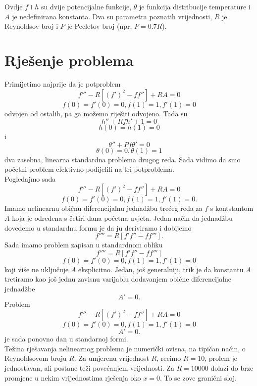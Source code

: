 \documentclass[a4paper,12pt]{article}
\newtheorem{rem}[thm]{Napomena}
\newtheorem{exa}[thm]{Primjer}
\begin{document}
Ovdje $f$ i $h$ su dvije potencijalne funkcije, $\theta$ je funkcija distribucije temperature i $A$ je nedefinirana konstanta. Dva su parametra poznatih vrijednosti, $R$ je Reynoldsov broj i $P$ je Pecletov broj (npr. $P=0.7R$).\\
  




\section{Rješenje problema}


Primijetimo najprije da je potproblem
\[ f''' - R [(f')^2 - ff''] + RA = 0 \]
\[ f(0)=f'(0)=0, f(1)=1, f'(1)=0 \]
odvojen od ostalih, pa ga možemo riješiti odvojeno. Tada su 
\[ h'' + Rfh' + 1 = 0 \]
\[ h(0)=h(1)=0 \]
i
\[ \theta'' + Pf\theta' = 0 \]
\[ \theta(0)=0, \theta(1)=1 \]
dva zasebna, linearna standardna problema drugog reda. Sada vidimo da smo početni problem efektivno podijelili na tri potproblema. \\

Pogledajmo sada  
\[ f''' - R [(f')^2 - ff''] + RA = 0 \]
\[ f(0)=f'(0)=0, f(1)=1, f'(1)=0  .\]
Imamo nelinearnu običnu diferencijalnu jednadžbu trećeg reda za $f$ s kontstantom $A$ koja je  određena s četiri dana početna uvjeta. Jedan način da jednadžbu dovedemo u standardnu formu je da ju deriviramo i dobijemo
\[ f''''=R[f'f'' - ff''']  .\]
Sada imamo problem zapisan u standardnom obliku 
\[ f''''=R[f'f'' - ff'''] \]
\[ f(0)=f'(0)=0, f(1)=1, f'(1)=0 \]
koji više ne uključuje $A$ eksplicitno. Jedan, još generalniji, trik je da konstantu $A$ tretiramo kao još jednu zavisnu varijablu dodavanjem obične diferencijalne jednadžbe 
\[ A'=0. \]
Problem 
\[ f''' - R [(f')^2 - ff''] + RA = 0 \]
\[ f(0)=f'(0)=0, f(1)=1, f'(1)=0 \]
\[ A'=0. \]
je sada ponovno dan u standarnoj formi. \\

Težina rješavanja nelinearnog problema je numerički ovisna, na tipičan način, o Reynoldsovom broju $R$. Za umjerenu vrijednost $R$, recimo $R=10$, prolem je jednostavan, ali postane teži povećanjem vrijednosti. Za $R=10000$ dolazi do brze promjene u nekim vrijednostima rješenja oko $x=0$. To se zove granični sloj. 
\end{document}
